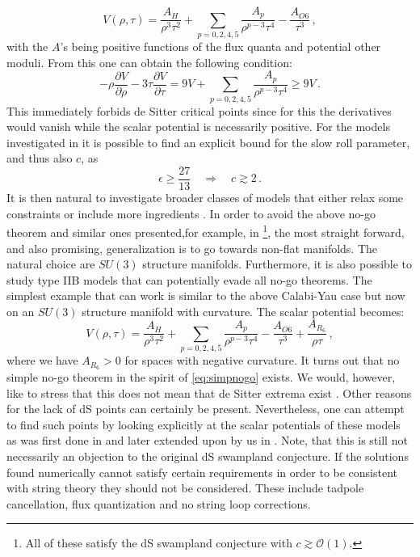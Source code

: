 \documentclass[12pt]{report}
\newcommand{\be}{\begin{equation}}
\newcommand{\ee}{\end{equation}}
\begin{document}
\be 
V(\rho,\tau) = \frac{A_H}{\rho^3 \tau^2} + \sum_{p=0,2,4,5} \frac{A_p}{\rho^ {p-3} \tau^4} - \frac{A_{O6}}{\tau^3}\,,
\ee
with the $A$'s being positive functions of the flux quanta and potential other moduli. From this one can obtain the following condition:
\be 
-\rho \frac{\partial V}{\partial \rho} - 3 \tau \frac{\partial V}{\partial \tau} = 9 V + \sum_{p=0,2,4,5} \frac{A_p}{\rho^ {p-3} \tau^4} \geq 9V\,.
\label{eq:simpnogo}
\ee
This immediately forbids de Sitter critical points since for this the derivatives would vanish while the scalar potential is necessarily positive. For the models investigated in \cite{Hertzberg:2007wc} it is possible to find an explicit bound for the slow roll parameter, and thus also $c$, as
\be 
\epsilon \geq \frac{27}{13} \quad \Rightarrow \quad c \gtrsim 2\,.
\ee 
It is then natural to investigate broader classes of models that either relax some constraints or include more ingredients \cite{Caviezel:2008tf,Flauger:2008ad,Saltman:2004jh,Silverstein:2007ac,Haque:2008jz,Danielsson:2009ff,deCarlos:2009fq,deCarlos:2009qm,Caviezel:2009tu,Danielsson:2010bc,Dong:2010pm,Andriot:2010ju}. In order to avoid the above no-go theorem and similar ones presented,for example, in \cite{Flauger:2008ad,Silverstein:2007ac,Haque:2008jz,Danielsson:2009ff,Caviezel:2009tu,Caviezel:2008ik,Wrase:2010ew,Andriot:2016xvq,Andriot:2017jhf}\footnote{All of these satisfy the dS swampland conjecture with $c \gtrsim \mathcal{O}(1)$.}, the most straight forward, and also promising, generalization is to go towards non-flat manifolds. The natural choice are $SU(3)$ structure manifolds. Furthermore, it is also possible to study type IIB models that can potentially evade all no-go theorems. The simplest example that can work is similar to the above Calabi-Yau case but now on an $SU(3)$ structure manifold with curvature. The scalar potential becomes:
\be 
V(\rho,\tau) = \frac{A_H}{\rho^3 \tau^2} + \sum_{p=0,2,4,5} \frac{A_p}{\rho^ {p-3} \tau^4} - \frac{A_{O6}}{\tau^3} + \frac{A_{R_6}}{\rho\tau}\,,
\ee
where we have $A_{R_6}>0$ for spaces with negative curvature. It turns out that no simple no-go theorem in the spirit of \eqref{eq:simpnogo} exists. We would, however, like to stress that this does not mean that de Sitter extrema exist \cite{Obied:2018sgi}. Other reasons for the lack of dS points can certainly be present. Nevertheless, one can attempt to find such points by looking explicitly at the scalar potentials of these models as was first done in \cite{Caviezel:2008tf,Flauger:2008ad} and later extended upon by us in \cite{Roupec:2018mbn}. Note, that this is still not necessarily an objection to the original dS swampland conjecture. If the solutions found numerically cannot satisfy certain requirements in order to be consistent with string theory they should not be considered. These include tadpole cancellation, flux quantization and no string loop corrections.
\end{document}
